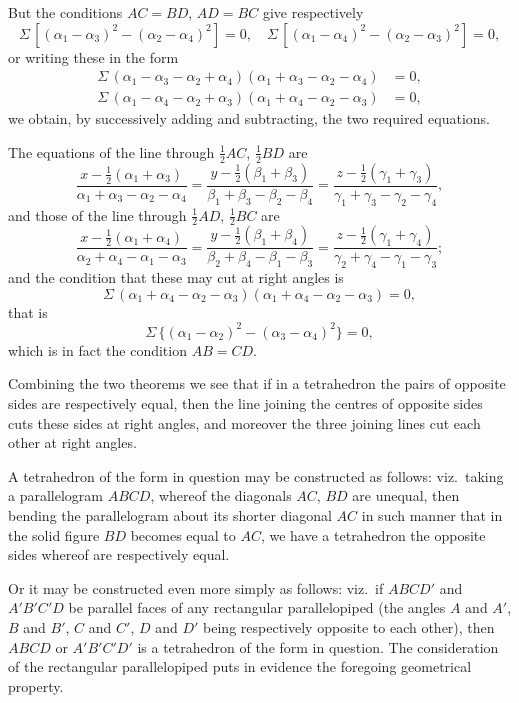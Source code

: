 \documentclass[11pt,a4paper]{article}
\begin{document}
But the conditions $AC=BD$, $AD=BC$ give respectively
\[
\Sigma\,[(\alpha_1-\alpha_3)^2 - (\alpha_2-\alpha_4)^2] = 0,\quad
\Sigma\,[(\alpha_1-\alpha_4)^2 - (\alpha_2-\alpha_3)^2] = 0,
\]
or writing these in the form
\begin{align*}
\Sigma\,(\alpha_1-\alpha_3-\alpha_2+\alpha_4)(\alpha_1+\alpha_3-\alpha_2-\alpha_4) &= 0,\\
\Sigma\,(\alpha_1-\alpha_4-\alpha_2+\alpha_3)(\alpha_1+\alpha_4-\alpha_2-\alpha_3) &= 0,
\end{align*}
we obtain, by successively adding and subtracting, the two required equations.

The equations of the line through $\frac12AC$, $\frac12BD$ are
\[
\frac{x-\frac12(\alpha_1+\alpha_3)}{\alpha_1+\alpha_3-\alpha_2-\alpha_4}
= \frac{y-\frac12(\beta_1+\beta_3)}{\beta_1+\beta_3-\beta_2-\beta_4}
= \frac{z-\frac12(\gamma_1+\gamma_3)}{\gamma_1+\gamma_3-\gamma_2-\gamma_4},
\]
and those of the line through $\frac12AD$, $\frac12BC$ are
\[
\frac{x-\frac12(\alpha_1+\alpha_4)}{\alpha_2+\alpha_4-\alpha_1-\alpha_3}
= \frac{y-\frac12(\beta_1+\beta_4)}{\beta_2+\beta_4-\beta_1-\beta_3}
= \frac{z-\frac12(\gamma_1+\gamma_4)}{\gamma_2+\gamma_4-\gamma_1-\gamma_3};
\]
and the condition that these may cut at right angles is
\[
\Sigma\,(\alpha_1+\alpha_4-\alpha_2-\alpha_3)(\alpha_1+\alpha_4-\alpha_2-\alpha_3) = 0,
\]
that is
\[
\Sigma\,\{(\alpha_1-\alpha_2)^2 - (\alpha_3-\alpha_4)^2\} = 0,
\]
which is in fact the condition $AB=CD$.

Combining the two theorems we see that if in a tetrahedron the pairs of opposite
sides are respectively equal, then the line joining the centres of opposite sides cuts
these sides at right angles, and moreover the three joining lines cut each other at
right angles.

A tetrahedron of the form in question may be constructed as follows: viz.\ taking
a parallelogram $ABCD$, whereof the diagonals $AC$, $BD$ are unequal, then bending the
parallelogram about its shorter diagonal $AC$ in such manner that in the solid figure
$BD$ becomes equal to $AC$, we have a tetrahedron the opposite sides whereof are
respectively equal.

Or it may be constructed even more simply as follows: viz.\ if $ABCD'$ and
$A'B'C'D$ be parallel faces of any rectangular parallelopiped (the angles $A$ and $A'$,
$B$ and $B'$, $C$ and $C'$, $D$ and $D'$ being respectively opposite to each other), then $ABCD$
or $A'B'C'D'$ is a tetrahedron of the form in question. The consideration of the
rectangular parallelopiped puts in evidence the foregoing geometrical property.
\end{document}
